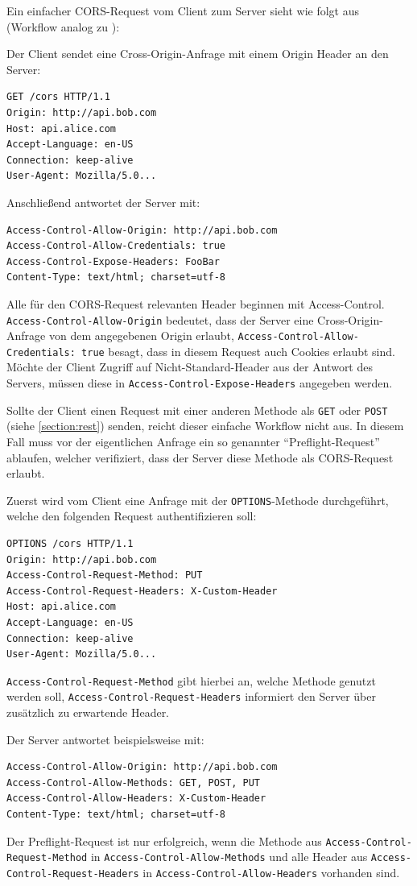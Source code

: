 Ein einfacher CORS-Request vom Client zum Server sieht wie folgt aus (Workflow analog zu \cite{cors_html5rocks}):

Der Client sendet eine Cross-Origin-Anfrage mit einem Origin Header an den Server:
\begin{lstlisting}
GET /cors HTTP/1.1
Origin: http://api.bob.com
Host: api.alice.com
Accept-Language: en-US
Connection: keep-alive
User-Agent: Mozilla/5.0...
\end{lstlisting}
 
Anschließend antwortet der Server mit:
\begin{lstlisting}
Access-Control-Allow-Origin: http://api.bob.com
Access-Control-Allow-Credentials: true
Access-Control-Expose-Headers: FooBar
Content-Type: text/html; charset=utf-8
\end{lstlisting}
Alle für den CORS-Request relevanten Header beginnen mit Access-Control. \\ \texttt{Access-Control-Allow-Origin} bedeutet, dass der Server eine Cross-Origin-Anfrage von dem angegebenen Origin erlaubt, \texttt{Access-Control-Allow-Credentials: true} besagt, dass in diesem Request auch Cookies erlaubt sind. Möchte der Client Zugriff auf Nicht-Standard-Header aus der Antwort des Servers, müssen diese in \texttt{Access-Control-Expose-Headers} angegeben werden.

Sollte der Client einen Request mit einer anderen Methode als \texttt{GET} oder \texttt{POST} (siehe \ref{section:rest}) senden, reicht dieser einfache Workflow nicht aus. In diesem Fall muss vor der eigentlichen Anfrage ein so genannter "`Preflight-Request"' ablaufen, welcher verifiziert, dass der Server diese Methode als CORS-Request erlaubt.

Zuerst wird vom Client eine Anfrage mit der \texttt{OPTIONS}-Methode durchgeführt, welche den folgenden Request authentifizieren soll:
\begin{lstlisting}
OPTIONS /cors HTTP/1.1
Origin: http://api.bob.com
Access-Control-Request-Method: PUT
Access-Control-Request-Headers: X-Custom-Header
Host: api.alice.com
Accept-Language: en-US
Connection: keep-alive
User-Agent: Mozilla/5.0...
\end{lstlisting}
\texttt{Access-Control-Request-Method} gibt hierbei an, welche Methode genutzt werden soll, \texttt{Access-Control-Request-Headers} informiert den Server über zusätzlich zu erwartende Header. 

Der Server antwortet beispielsweise mit:
\begin{lstlisting}
Access-Control-Allow-Origin: http://api.bob.com
Access-Control-Allow-Methods: GET, POST, PUT
Access-Control-Allow-Headers: X-Custom-Header
Content-Type: text/html; charset=utf-8
\end{lstlisting}
Der Preflight-Request ist nur erfolgreich, wenn die Methode aus \texttt{Access-Control-Request-Method} in \texttt{Access-Control-Allow-Methods} und alle Header aus \texttt{Access-Control-Request-Headers} in \texttt{Access-Control-Allow-Headers} vorhanden sind.

